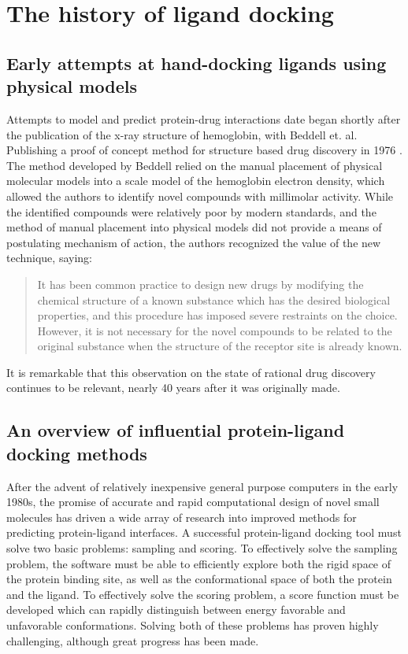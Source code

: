 \section{The history of ligand docking}

\subsection{Early attempts at hand-docking ligands using physical models}
Attempts to model and predict protein-drug interactions date began shortly after the publication of the x-ray structure of hemoglobin, with Beddell et. al. Publishing a proof of concept method for structure based drug discovery in 1976 \citep{BEDDELL:1976go}.
The method developed by Beddell relied on the manual placement of physical molecular models into a scale model of the hemoglobin electron density, which allowed the authors to identify novel compounds with millimolar activity. 
While the identified compounds were relatively poor by modern standards, and the method of manual placement into physical models did not provide a means of postulating mechanism of action, the authors recognized the value of the new technique, saying:
\begin{quote}
It has been common practice to design new drugs by modifying the chemical structure of a known substance which has the desired biological properties, and this procedure has imposed severe restraints on the choice.
However, it is not necessary for the novel compounds to be related to the original substance when the structure of the receptor site is already known. 
\end{quote}
It is remarkable that this observation on the state of rational drug discovery continues to be relevant, nearly 40 years after it was originally made. 

\subsection{An overview of influential protein-ligand docking methods}
After the advent of relatively inexpensive general purpose computers in the early 1980s, the promise of accurate and rapid computational design of novel small molecules has driven a wide array of research into improved methods for predicting protein-ligand interfaces.
A successful protein-ligand docking tool must solve two basic problems: sampling and scoring.
To effectively solve the sampling problem, the software must be able to efficiently explore both the rigid space of the protein binding site, as well as the conformational space of both 	the protein and the ligand.
To effectively solve the scoring problem, a score function must be developed which can rapidly distinguish between energy favorable and unfavorable conformations.
Solving both of these problems has proven highly challenging, although great progress has been made. 

